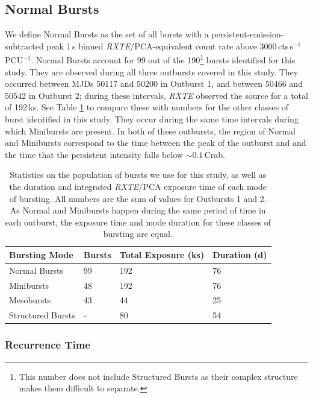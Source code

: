 \subsection{Normal Bursts}

\par We define Normal Bursts as the set of all bursts with a persistent-emission-subtracted peak 1\,s binned \textit{RXTE}/PCA-equivalent count rate above 3000\,cts\,s$^{-1}$\,PCU$^{-1}$.  Normal Bursts account for 99 out of the 190\footnote{This number does not include Structured Bursts as their complex structure makes them difficult to separate.} bursts identified for this study.  They are observed during all three outbursts covered in this study.  They occurred between MJDs 50117 and 50200 in Outburst 1, and between 50466 and 50542 in Outburst 2; during these intervals, \textit{RXTE} observed the source for a total of 192\,ks.  See Table \ref{tab:staretimes} to compare these with numbers for the other classes of burst identified in this study.  They occur during the same time intervals during which Minibursts are present.  In both of these outbursts, the region of Normal and Minibursts correspond to the time between the peak of the outburst and and the time that the persistent intensity falls below $\sim0.1$\,Crab.

\begin{table}
\centering
\begin{tabular}{llll}
\hline
\hline
\scriptsize  Bursting Mode &\scriptsize Bursts &\scriptsize Total Exposure (ks) &\scriptsize Duration (d) \\
\hline
Normal Bursts & 99  & 192 & 76\\
Minibursts & 48 & 192  & 76\\
Mesobursts & 43 &44 &25\\
Structured Bursts & - &80 &54 \\
\hline
\hline
\end{tabular}
\caption[Statistics on the population of Normal Bursts in Outbursts 1 and 2 of the Bursting Pulsar.]{Statistics on the population of bursts we use for this study, as well as the duration and integrated \textit{RXTE}/PCA exposure time of each mode of bursting.  All numbers are the sum of values for Outbursts 1 and 2.  As Normal and Minibursts happen during the same period of time in each outburst, the exposure time and mode duration for these classes of bursting are equal.}
\label{tab:staretimes}
\end{table}

\subsubsection{Recurrence Time}

